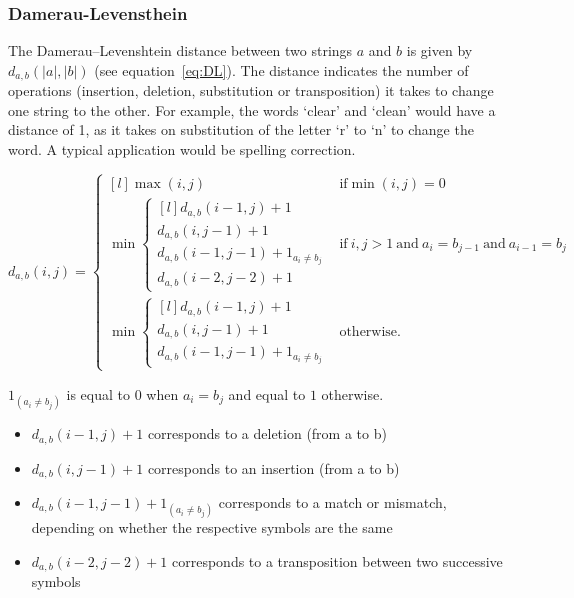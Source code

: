 \subsubsection{Damerau-Levensthein}

The Damerau–Levenshtein distance between two strings $a$ and $b$ is given by $d_{a,b}(|a|,|b|)$ (see equation~\ref{eq:DL}\sidepar{$\bm{\Sigma}$~\ref{eq:DL}})\autocite{WikipediaA, Damerau1964, Levenshtein1966}. The distance indicates the number of operations (insertion, deletion, substitution or transposition) it takes to change one string to the other. For example, the words `clear' and `clean' would have a distance of 1, as it takes on substitution of the letter `r' to `n' to change the word. A typical application would be spelling correction. 

\begin{equation}
  d_{a,b}(i,j)=\left\{\begin{matrix*}[l]
  \max(i,j) & \textrm{if}\min(i,j)=0\\
  \min\left\{\begin{matrix*}[l]
  d_{a,b}(i-1,j)+1\\
  d_{a,b}(i,j-1)+1\\
  d_{a,b}(i-1,j-1)+1_{a_i\neq b_j}\\
  d_{a,b}(i-2,j-2)+1
  \end{matrix*}\right. & \textrm{if}\ i,j > 1 \ \textrm{and}\ a_i = b_{j-1}\ \textrm{and}\ a_{i-1} = b_j\\
  \min\left\{\begin{matrix*}[l]
  d_{a,b}(i-1,j)+1\\
  d_{a,b}(i,j-1)+1\\
  d_{a,b}(i-1,j-1)+1_{a_i\neq b_j}
\end{matrix*}\right. & \textrm{otherwise.}
  \end{matrix*}\right.
  \label{eq:DL}
\end{equation}

$1_{(a_i \neq b_j)}$ is equal to $0$ when $a_i = b_j$ and equal to $1$ otherwise. 

\begin{itemize}
  \item $d_{a,b}(i-1,j) + 1$ corresponds to a deletion (from a to b)
  \item $d_{a,b}(i,j-1) + 1$ corresponds to an insertion (from a to b)
  \item $d_{a,b}(i-1,j-1) + 1_{(a_i \neq b_j)}$  corresponds to a match or mismatch, depending on whether the respective symbols are the same
  \item $d_{a,b}(i-2,j-2) + 1$  corresponds to a transposition between two successive symbols
\end{itemize}


